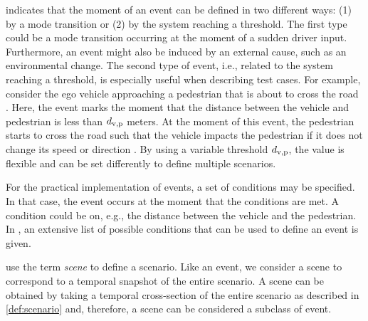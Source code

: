  indicates that the moment of an event can be defined in two different ways: \cstart(1) by a mode transition or (2) by the system reaching a threshold. 
The first type \cend\cstartd could be a mode transition occurring \cendd\cstart at the moment of a sudden driver input. Furthermore, an event might also be induced by an external cause, such as an environmental change. The second type of event, i.e., related to the system reaching a threshold, \cend is especially useful when describing test cases. For example, consider the ego vehicle approaching a pedestrian that is about to cross the road \autocite{seiniger2015test}. 
Here, the event marks the moment that the distance between the vehicle and pedestrian is less than $d_{\mathrm{v,p}}$ meters. 
At the moment of this event, the pedestrian starts to cross the road such that the vehicle impacts the pedestrian if it does not change its speed or direction \autocite{seiniger2015test}.
By using a variable threshold $d_{\mathrm{v,p}}$, the value is flexible and can be set differently to define multiple scenarios.

For the practical implementation of events, a set of conditions may be specified. In that case, the event occurs at the moment that the conditions are met. A condition could be on, e.g., the distance between the vehicle and the pedestrian. In \autocite{openscenario}, an extensive list of possible conditions that can be used to define an event is given.

\cstarte\begin{remark}
	\textcite{geyer2014,ulbrich2015} use the term \emph{scene} to define a scenario.
	Like an event, we consider a scene to correspond to a temporal snapshot of the entire scenario. A scene can be obtained by taking a temporal cross-section of the entire scenario as described in \cref{def:scenario} and, therefore, a scene can be considered a subclass of event.
\end{remark}\cende




